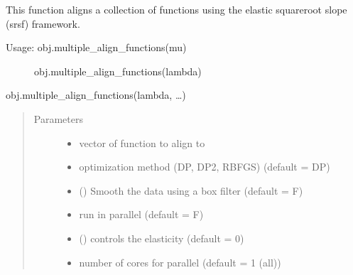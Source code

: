 \documentclass[letterpaper,10pt,english]{sphinxmanual}
\begin{document}
\begin{fulllineitems}
\begin{fulllineitems}
\label{\detokenize{time_warping:time_warping.fdawarp.multiple_align_functions}}
This function aligns a collection of functions using the elastic square\sphinxhyphen{}root
slope (srsf) framework.
\begin{description}
\item[{Usage:  obj.multiple\_align\_functions(mu)}] \leavevmode
obj.multiple\_align\_functions(lambda)

\end{description}

obj.multiple\_align\_functions(lambda, …)
\begin{quote}\begin{description}
\item[{Parameters}] \leavevmode\begin{itemize}
\item {} 
 \textendash{} vector of function to align to

\item {} 
 \textendash{} optimization method (DP, DP2, RBFGS) (default = DP)

\item {} 
 () \textendash{} Smooth the data using a box filter (default = F)

\item {} 
 \textendash{} run in parallel (default = F)

\item {} 
 () \textendash{} controls the elasticity (default = 0)

\item {} 
 \textendash{} number of cores for parallel (default = \sphinxhyphen{}1 (all))


\end{itemize}
\end{description}
\end{quote}
\end{fulllineitems}
\end{fulllineitems}
\end{document}
